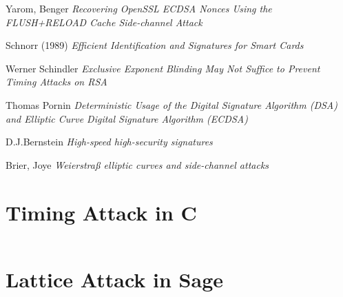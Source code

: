 \documentclass[a4paper,11pt]{article}
\begin{document}
\begin{thebibliography}{1}
 Yarom, Benger {\em Recovering OpenSSL ECDSA Nonces Using the FLUSH+RELOAD Cache Side-channel Attack}

 Schnorr (1989) {\em Efficient Identification and Signatures for Smart Cards}

 Werner Schindler {\em Exclusive Exponent Blinding May Not Suffice to Prevent Timing Attacks on RSA}

 Thomas Pornin {\em Deterministic Usage of the Digital Signature Algorithm (DSA) and Elliptic Curve Digital Signature Algorithm (ECDSA)}

 D.J.Bernstein {\em High-speed high-security signatures}

 Brier, Joye {\em Weierstraß elliptic curves and side-channel attacks}

\end{thebibliography}

\newpage

\appendix 

\section{Timing Attack in C}

\inputminted[breaklines]{c}{attack.c}

\newpage

\section{Lattice Attack in Sage}

\inputminted[breaklines]{sage}{lattice.sage}
\end{document}
